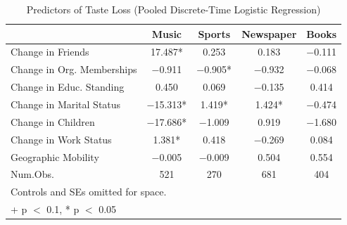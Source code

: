 \begin{table}
\centering
\caption{Predictors of Taste Loss (Pooled Discrete-Time Logistic Regression)}
\centering
\begin{tabular}[t]{lcccc}
\toprule
  & Music & Sports & Newspaper & Books\\
\midrule
Change in Friends & \num{17.487}* & \num{0.253} & \num{0.183} & \num{-0.111}\\
Change in Org. Memberships & \num{-0.911} & \num{-0.905}* & \num{-0.932} & \num{-0.068}\\
Change in Educ. Standing & \num{0.450} & \num{0.069} & \num{-0.135} & \num{0.414}\\
Change in Marital Status & \num{-15.313}* & \num{1.419}* & \num{1.424}* & \num{-0.474}\\
Change in Children & \num{-17.686}* & \num{-1.009} & \num{0.919} & \num{-1.680}\\
Change in Work Status & \num{1.381}* & \num{0.418} & \num{-0.269} & \num{0.084}\\
Geographic Mobility & \num{-0.005} & \num{-0.009} & \num{0.504} & \num{0.554}\\
\midrule
Num.Obs. & \num{521} & \num{270} & \num{681} & \num{404}\\
\bottomrule
\multicolumn{5}{l}{\rule{0pt}{1em}Controls and SEs omitted for space.}\\
\multicolumn{5}{l}{\rule{0pt}{1em}+ p $<$ 0.1, * p $<$ 0.05}\\
\end{tabular}
\end{table}
